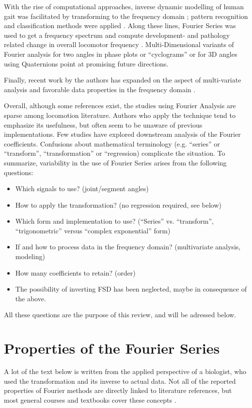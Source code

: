 With the rise of computational approaches, inverse dynamic modelling of human gait was facilitated by transforming to the frequency domain \citep{Ren2007}; pattern recognition and classification methods were applied \citep[e.g.][]{Mostayed2008}.
Along these lines, Fourier Series was used to get a frequency spectrum and compute development- and pathology related change in overall locomotor frequency \citep[e.g.][]{Kurz2011}.
Multi-Dimensional variants of Fourier analysis for two angles in phase plots or ``cyclograms'' \citep{DiBerardinoIII2010} or for 3D angles using Quaternions \citep{Kenwright2015} point at promising future directions.


Finally, recent work by the authors has expanded on the aspect of multi-variate analysis and favorable data properties in the frequency domain \citep{Mielke2019,Mielke2023}.


Overall, although some references exist, the studies using Fourier Analysis are sparse among locomotion literature.
Authors who apply the technique tend to emphasize its usefulness, but often seem to be unaware of previous implementations.
Few studies have explored downstream analysis of the Fourier coefficients.
Confusions about mathematical terminology (e.g. ``series'' or ``transform'', ``transformation'' or ``regression) complicate the situation.
To summarize, variability in the use of Fourier Series arises from the following questions:
\begin{itemize}
\item Which signals to use? (joint/segment angles)
\item How to apply the transformation? (no regression required, see below)
\item Which form and implementation to use? (``Series'' vs. ``transform'', ``trigonometric'' versus ``complex exponential'' form)
\item If and how to process data in the frequency domain? (multivariate analysis, modeling)
\item How many coefficients to retain? (order)
\item The possibility of inverting FSD has been neglected, maybe in consequence of the above.
\end{itemize}

All these questions are the purpose of this review, and will be adressed below.

\FloatBarrier\clearpage
\section{Properties of the Fourier Series}
\label{properties}
A lot of the text below is written from the applied perspective of a biologist, who used the transformation and its inverse to actual data.
Not all of the reported properties of Fourier methods are directly linked to literature references, but most general courses and textbooks cover these concepts \citep[e.g.][]{Bracewell2000,Osgood2007,Osgood2019}.


